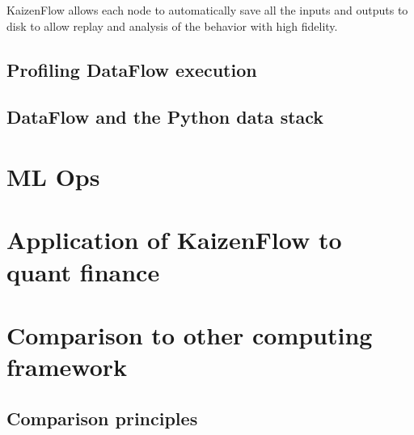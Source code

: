\documentclass[11pt, reqno]{amsart}
\theoremstyle{definition}
\theoremstyle{remark}
\begin{document}
KaizenFlow allows each node to automatically save all the inputs and
outputs to disk to allow replay and analysis of the behavior with high
fidelity.

\subsection{Profiling DataFlow execution}


\subsection{DataFlow and the Python data stack}
%

\section{ML Ops}

\section{Application of KaizenFlow to quant finance}


\section{Comparison to other computing framework}

\subsection{Comparison principles}
\end{document}

